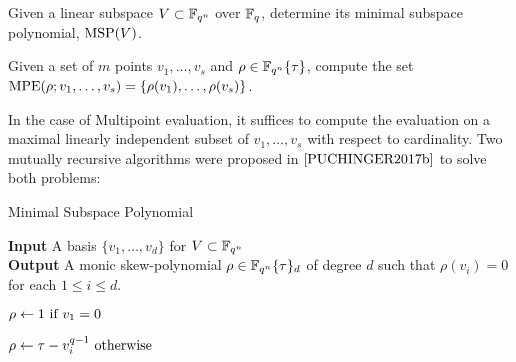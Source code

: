 \begin{problem}
Given a linear subspace $V \subset \mathbb{F}_{q^n}$ over $\mathbb{F}_q$, determine its minimal subspace polynomial, $\textnormal{MSP}(V)$.
\end{problem}

\begin{problem}
Given a set of $m$ points $v_1, \ldots, v_s$ and $\rho \in \mathbb{F}_{q^n}\{\tau\}$, compute the set $\textnormal{MPE}(\rho; v_1, \ldots, v_s) = \{ \rho(v_1), \ldots, \rho(v_s) \}$.
\end{problem}

In the case of Multipoint evaluation, it suffices to compute the evaluation on a maximal linearly independent subset of $v_1, \ldots, v_s$ with respect to cardinality. Two mutually recursive algorithms were proposed in $\cite{PUCHINGER2017b}$ to solve both problems:

\begin{algorithm}
\caption{Minimal Subspace Polynomial \cite{PUCHINGER2017b}}
\label{msp1}
\hspace*{\algorithmicindent} \textbf{Input} A basis $\{ v_1, \ldots, v_d \}$ for $V \subset \mathbb{F}_{q^n}$\\
 \hspace*{\algorithmicindent} \textbf{Output} A monic skew-polynomial $\rho \in \mathbb{F}_{q^n}\{\tau\}_d$ of degree $d$ such that $\rho(v_i) = 0$ for each $1 \leq i \leq d$.  \\
 \begin{algorithmic}[1]
            \State $\rho \gets 1 \textnormal{ if } v_1 = 0$

            \State  $ \rho \gets \tau - v_i^{q-1} \textnormal{ otherwise}$
        
    \EndIf
\end{algorithmic}
\end{algorithm}

